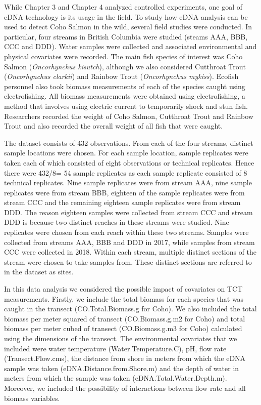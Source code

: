


\label{chapter:Fieldalt}


While Chapter 3 and Chapter 4 analyzed controlled experiments, one goal of eDNA technology is its usage in the field. To study how eDNA analysis can be used to detect Coho Salmon in the wild, several field studies were conducted. In particular, four streams in British Columbia were studied (steams AAA, BBB, CCC and DDD). Water samples were collected and associated environmental and physical covariates were recorded. The main fish species of interest was Coho Salmon (\textit{Oncorhynchus kisutch}), although we also considered Cutthroat Trout (\textit{Oncorhynchus clarkii}) and Rainbow Trout (\textit{Oncorhynchus mykiss}). Ecofish personnel also took biomass measurements of each of the species caught using electrofishing.  All biomass measurements were obtained using electrofishing, a method that involves using electric current to temporarily shock and stun fish. Researchers recorded the weight of Coho Salmon, Cutthroat Trout and Rainbow Trout and also recorded the overall weight of all fish that were caught.

\vspace{4mm}

The dataset consists of 432 observations. From each of the four streams, distinct sample locations were chosen. For each sample location, sample replicates were taken each of which consisted of eight observations or technical replicates. Hence there were  432/8= 54 sample replicates as each sample replicate consisted of 8 technical replicates. Nine sample replicates were from stream AAA, nine sample replicates were from stream BBB, eighteen of the sample replicates were from stream CCC and the remaining eighteen sample replicates were from stream DDD. The reason eighteen samples were collected from stream CCC and stream DDD is because two distinct reaches in these streams were studied. Nine replicates were chosen from each reach within these two streams. Samples were collected from streams AAA, BBB and DDD in 2017, while samples from stream CCC were collected in 2018. Within each stream, multiple distinct sections of the stream were chosen to take samples from. These distinct sections are referred to in the dataset as sites.

\vspace{5mm}

In this data analysis we considered the possible impact of covariates on TCT measurements. Firstly, we include the total biomass for each species that was caught in the transect (CO.Total.Biomass.g for Coho). We also included the total biomass per meter squared of transect (CO.Biomass.g.m2 for Coho) and total biomass per meter cubed of transect (CO.Biomass.g.m3 for Coho) calculated using the dimensions of the transect. The environmental covariates that we included were water temperature (Water.Temperature.C), pH, flow rate (Transect.Flow.cms), the distance from shore in meters from which the eDNA sample was taken (eDNA.Distance.from.Shore.m) and the depth of water in meters from which the sample was taken (eDNA.Total.Water.Depth.m). Moreover, we included the possibility of interactions between flow rate and all biomass variables.

